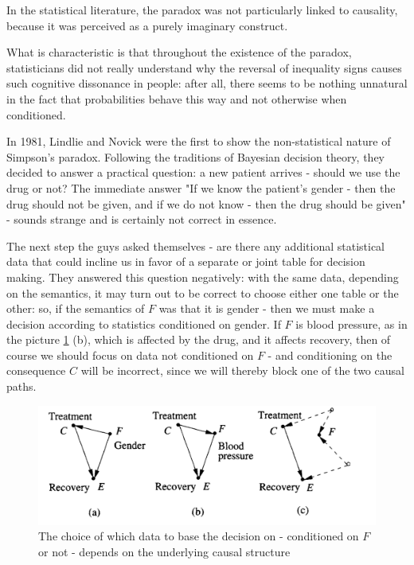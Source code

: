\documentclass[fleqn]{article}
\numberwithin{equation}{section}
\numberwithin{theorem}{section}
\numberwithin{figure}{section}
\numberwithin{lemma}{section}
\numberwithin{corollary}{section}
\begin{document}
In the statistical literature, the paradox was not particularly linked to causality, because it was perceived as a purely imaginary construct.

What is characteristic is that throughout the existence of the paradox, statisticians did not really understand why the reversal of inequality signs causes such cognitive dissonance in people: after all, there seems to be nothing unnatural in the fact that probabilities behave this way and not otherwise when conditioned.

In 1981, Lindlie and Novick were the first to show the non-statistical nature of Simpson's paradox. Following the traditions of Bayesian decision theory, they decided to answer a practical question: a new patient arrives - should we use the drug or not? The immediate answer "If we know the patient's gender - then the drug should not be given, and if we do not know - then the drug should be given" - sounds strange and is certainly not correct in essence.

The next step the guys asked themselves - are there any additional statistical data that could incline us in favor of a separate or joint table for decision making. They answered this question negatively: with the same data, depending on the semantics, it may turn out to be correct to choose either one table or the other: so, if the semantics of $F$ was that it is gender - then we must make a decision according to statistics conditioned on gender. If $F$ is blood pressure, as in the picture \ref{fig:simpson2} (b), which is affected by the drug, and it affects recovery, then of course we should focus on data not conditioned on $F$ - and conditioning on the consequence $C$ will be incorrect, since we will thereby block one of the two causal paths.

\begin{figure}[h]
	\begin{center}
		\includegraphics[scale=0.6]{imgs/img29.png}
	\end{center}
	\caption{The choice of which data to base the decision on - conditioned on $F$ or not - depends on the underlying causal structure}
	\label{fig:simpson2}
\end{figure}
\end{document}
